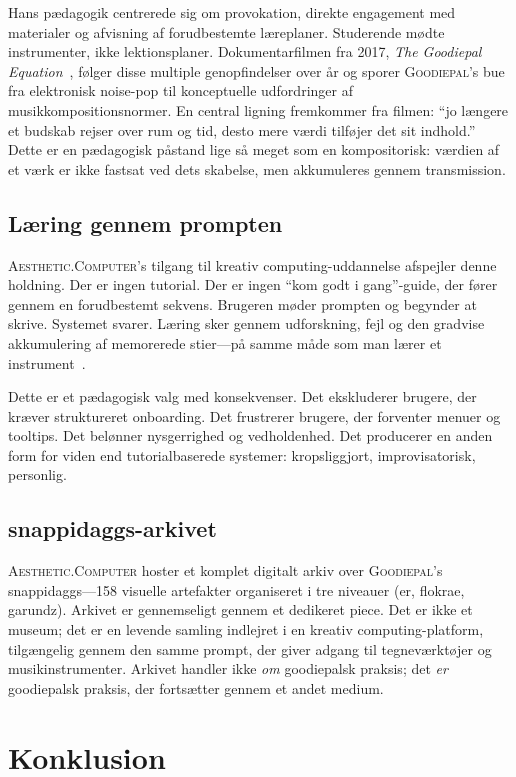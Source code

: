 \documentclass[10pt,letterpaper,twocolumn]{article}
\newcommand{\ac}{\textsc{Aesthetic.Computer}}
\newcommand{\gp}{\textsc{Goodiepal}}
\begin{document}
Hans pædagogik centrerede sig om provokation, direkte engagement med materialer og afvisning af forudbestemte læreplaner. Studerende mødte instrumenter, ikke lektionsplaner. Dokumentarfilmen fra 2017, \emph{The Goodiepal Equation}~\citep{sanpakkila2017equation}, følger disse multiple genopfindelser over år og sporer \gp{}'s bue fra elektronisk noise-pop til konceptuelle udfordringer af musikkompositionsnormer. En central ligning fremkommer fra filmen: ``jo længere et budskab rejser over rum og tid, desto mere værdi tilføjer det sit indhold.'' Dette er en pædagogisk påstand lige så meget som en kompositorisk: værdien af et værk er ikke fastsat ved dets skabelse, men akkumuleres gennem transmission.

\subsection{Læring gennem prompten}

\ac{}'s tilgang til kreativ computing-uddannelse afspejler denne holdning. Der er ingen tutorial. Der er ingen ``kom godt i gang''-guide, der fører gennem en forudbestemt sekvens. Brugeren møder prompten og begynder at skrive. Systemet svarer. Læring sker gennem udforskning, fejl og den gradvise akkumulering af memorerede stier---på samme måde som man lærer et instrument~\citep{papert1980mindstorms}.

Dette er et pædagogisk valg med konsekvenser. Det ekskluderer brugere, der kræver struktureret onboarding. Det frustrerer brugere, der forventer menuer og tooltips. Det belønner nysgerrighed og vedholdenhed. Det producerer en anden form for viden end tutorialbaserede systemer: kropsliggjort, improvisatorisk, personlig.

\subsection{snappidaggs-arkivet}

\ac{} hoster et komplet digitalt arkiv over \gp{}'s snappidaggs---158 visuelle artefakter organiseret i tre niveauer (er, flokrae, garundz). Arkivet er gennemseligt gennem et dedikeret piece. Det er ikke et museum; det er en levende samling indlejret i en kreativ computing-platform, tilgængelig gennem den samme prompt, der giver adgang til tegneværktøjer og musikinstrumenter. Arkivet handler ikke \emph{om} goodiepalsk praksis; det \emph{er} goodiepalsk praksis, der fortsætter gennem et andet medium.

\section{Konklusion}
\end{document}
